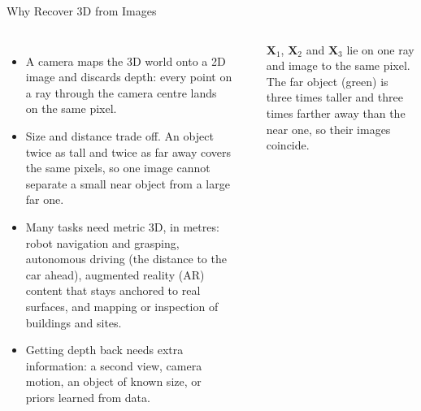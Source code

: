 \begin{frame}{Why Recover 3D from Images}
  \begin{columns}[T,onlytextwidth]
      \begin{itemize}\footnotesize\itemsep0.35em
        \item A camera maps the 3D world onto a 2D image and discards depth: every point on a ray through the camera centre lands on the same pixel.
        \item Size and distance trade off. An object twice as tall and twice as far away covers the same pixels, so one image cannot separate a small near object from a large far one.
        \item Many tasks need metric 3D, in metres: robot navigation and grasping, autonomous driving (the distance to the car ahead), augmented reality (AR) content that stays anchored to real surfaces, and mapping or inspection of buildings and sites.
        \item Getting depth back needs extra information: a second view, camera motion, an object of known size, or priors learned from data.
      \end{itemize}
      \centering
      \vspace{0.4em}
      \\[0.5em]
      {\scriptsize $\mathbf{X}_1$, $\mathbf{X}_2$ and $\mathbf{X}_3$ lie on one ray and image to the same pixel. The far object (green) is three times taller and three times farther away than the near one, so their images coincide.\par}
  \end{columns}
\end{frame}

